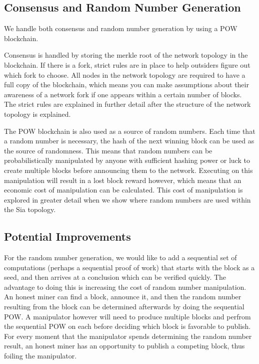 \documentclass[twocolumn]{article}
\begin{document}
\begin{appendices}

\section{Consensus and Random Number Generation}
We handle both consensus and random number generation by using a POW blockchain.

Consensus is handled by storing the merkle root of the network topology in the blockchain.
If there is a fork, strict rules are in place to help outsiders figure out which fork to choose.
All nodes in the network topology are required to have a full copy of the blockchain, which means you can make assumptions about their awareness of a network fork if one appears within a certain number of blocks.
The strict rules are explained in further detail after the structure of the network topology is explained.

The POW blockchain is also used as a source of random numbers.
Each time that a random number is necessary, the hash of the next winning block can be used as the source of randomness.
This means that random numbers can be probabilistically manipulated by anyone with sufficient hashing power or luck to create multiple blocks before announcing them to the network.
Executing on this manipulation will result in a lost block reward however, which means that an economic cost of manipulation can be calculated.
This cost of manipulation is explored in greater detail when we show where random numbers are used within the Sia topology.

\subsection{Potential Improvements}
For the random number generation, we would like to add a sequential set of computations (perhaps a sequential proof of work) that starts with the block as a seed, and then arrives at a conclusion which can be verified quickly.
The advantage to doing this is increasing the cost of random number manipulation.
An honest miner can find a block, announce it, and then the random number resulting from the block can be determined afterwards by doing the sequential POW.
A manipulator however will need to produce multiple blocks and perfrom the sequential POW on each before deciding which block is favorable to publish.
For every moment that the manipulator spends determining the random number result, an honest miner has an opportunity to publish a competing block, thus foiling the manipulator.


\end{appendices}
\end{document}
